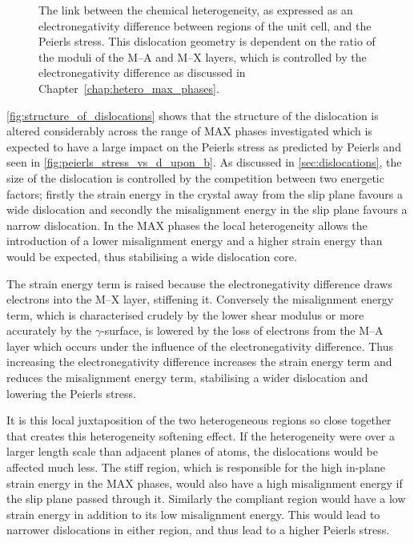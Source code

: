 \begin{figure}
\caption[The link between the structure of dislocations and local heterogeneity.]{The link between the chemical heterogeneity, as expressed as an electronegativity difference between regions of the unit cell, and the Peierls stress. This dislocation geometry is dependent on the ratio of the moduli of the M--A and M--X layers, which is controlled by the electronegativity difference as discussed in Chapter~\ref{chap:hetero_max_phases}. \label{fig:structure_of_dislocations}}
\end{figure}


\autoref{fig:structure_of_dislocations} shows that the structure of the dislocation is altered considerably across the range of MAX phases investigated which is expected to have a large impact on the Peierls stress as predicted by Peierls and seen in \autoref{fig:peierls_stress_vs_d_upon_b}. As discussed in \autoref{sec:dislocations}, the size of the dislocation is controlled by the competition between two energetic factors; firstly the strain energy in the crystal away from the slip plane favours a wide dislocation and secondly the misalignment energy in the slip plane favours a narrow dislocation. In the MAX phases the local heterogeneity allows the introduction of a lower misalignment energy and a higher strain energy than would be expected, thus stabilising a wide dislocation core.

The strain energy term is raised because the electronegativity difference draws electrons into the M--X layer, stiffening it. Conversely the misalignment energy term, which is characterised crudely by the lower shear modulus or more accurately by the $\gamma$-surface, is lowered by the loss of electrons from the M--A layer which occurs under the influence of the electronegativity difference. Thus increasing the electronegativity difference increases the strain energy term and reduces the misalignment energy term, stabilising a wider dislocation and lowering the Peierls stress.

It is this local juxtaposition of the two heterogeneous regions so close together that creates this heterogeneity softening effect. If the heterogeneity were over a larger length scale than adjacent planes of atoms, the dislocations would be affected much less. The stiff region, which is responsible for the high in-plane strain energy in the MAX phases, would also have a high misalignment energy if the slip plane passed through it. Similarly the compliant region would have a low strain energy in addition to its low misalignment energy. This would lead to narrower dislocations in either region, and thus lead to a higher Peierls stress.





